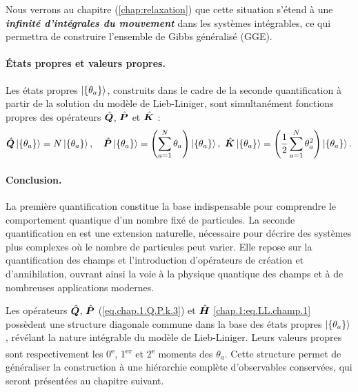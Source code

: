 \begin{mdframed}[
	linewidth=0.5pt, 
	backgroundcolor=gray!5, 
	roundcorner=50pt,	
	innerleftmargin=5pt,
    innerrightmargin=5pt,
    innertopmargin=5pt,
    innerbottommargin=2pt,
    leftmargin=2pt,
    rightmargin=2pt
	]
	Nous verrons au chapitre (\ref{chap:relaxation}) que cette situation s’étend à une {\bf \em infinité d’intégrales du mouvement} dans les systèmes intégrables, ce qui permettra de construire l’ensemble de Gibbs généralisé (GGE).
\end{mdframed}

\paragraph{États propres et valeurs propres.}
Les états propres $\ket{\{\theta_a\}}$, construits dans le cadre de la seconde quantification à partir de la solution du modèle de Lieb-Liniger, sont simultanément fonctions propres des opérateurs $\hat{\bm{Q}}$, $\hat{\bm{P}}$ et $\hat{\bm{K}}$ :
\begin{eqnarray}
\hat{\bm{Q}} \ket{\{\theta_a\}} = N \ket{\{\theta_a\}}, \quad
\hat{\bm{P}} \ket{\{\theta_a\}} = \left( \sum_{a=1}^N \theta_a \right) \ket{\{\theta_a\}}, \
\hat{\bm{K}} \ket{\{\theta_a\}} = \left( \frac{1}{2} \sum_{a=1}^N \theta_a^2 \right) \ket{\{\theta_a\}}.
\end{eqnarray}

\paragraph*{Conclusion.}

La première quantification constitue la base indispensable pour comprendre le comportement quantique d’un nombre fixé de particules. La seconde quantification en est une extension naturelle, nécessaire pour décrire des systèmes plus complexes où le nombre de particules peut varier. Elle repose sur la quantification des champs et l’introduction d’opérateurs de création et d’annihilation, ouvrant ainsi la voie à la physique quantique des champs et à de nombreuses applications modernes.

\medskip

Les opérateurs $\hat{\bm{Q}}$, $\hat{\bm{P}}$ (\eqref{eq.chap.1.Q.P.k.3}) et $\hat{\bm{H}}$ \eqref{chap.1:eq.LL.champ.1} possèdent une structure diagonale commune dans la base des états propres $\ket{\{\theta_a\}}$, révélant la nature intégrable du modèle de Lieb-Liniger. Leurs valeurs propres sont respectivement les 0\textsuperscript{e}, 1\textsuperscript{er} et 2\textsuperscript{e} moments des $\theta_a$. Cette structure permet de généraliser la construction à une hiérarchie complète d’observables conservées, qui seront présentées au chapitre suivant.


